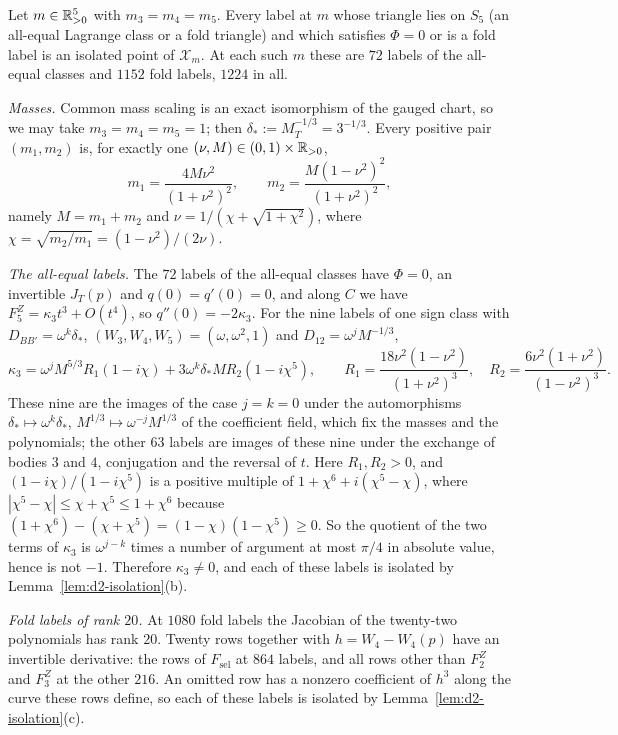 \begin{lemma}\label{lem:d2-L5}
Let $m\in\mathbb{R}_{>0}^5$ with $m_3=m_4=m_5$.  Every label at $m$ whose triangle lies on $S_5$ \textup{(}an
all-equal Lagrange class or a fold triangle\textup{)} and which satisfies $\Phi=0$ or is a fold
label is an isolated point of $\mathcal X_m$.  At each such $m$ these are $72$ labels of the all-equal
classes and $1152$ fold labels, $1224$ in all.
\end{lemma}

\emph{Masses.}  Common mass scaling is an exact isomorphism of the gauged chart, so we may take
$m_3=m_4=m_5=1$; then $\delta_*:=M_T^{-1/3}=3^{-1/3}$.  Every positive pair $(m_1,m_2)$ is, for
exactly one $(\nu,M)\in(0,1)\times\mathbb{R}_{>0}$,
\[
  m_1=\frac{4M\nu^2}{(1+\nu^2)^2},\qquad m_2=\frac{M(1-\nu^2)^2}{(1+\nu^2)^2},
\]
namely $M=m_1+m_2$ and $\nu=1/(\chi+\sqrt{1+\chi^2})$, where
$\chi=\sqrt{m_2/m_1}=(1-\nu^2)/(2\nu)$.

\emph{The all-equal labels.}  The $72$ labels of the all-equal classes have $\Phi=0$, an
invertible $J_T(p)$ and $q(0)=q'(0)=0$, and along $C$ we have $F^Z_5=\kappa_3t^3+O(t^4)$, so
$q''(0)=-2\kappa_3$.  For the nine labels of one sign class with $D_{BB'}=\omega^k\delta_*$,
$(W_3,W_4,W_5)=(\omega,\omega^2,1)$ and $D_{12}=\omega^jM^{-1/3}$,
\[
  \kappa_3=\omega^jM^{5/3}R_1(1-i\chi)+3\omega^k\delta_*MR_2(1-i\chi^5),\qquad
  R_1=\frac{18\nu^2(1-\nu^2)}{(1+\nu^2)^3},\quad R_2=\frac{6\nu^2(1+\nu^2)}{(1-\nu^2)^3}.
\]
These nine are the images of the case $j=k=0$ under the automorphisms
$\delta_*\mapsto\omega^k\delta_*$, $M^{1/3}\mapsto\omega^{-j}M^{1/3}$ of the coefficient field,
which fix the masses and the polynomials; the other $63$ labels are images of these nine under
the exchange of bodies $3$ and $4$, conjugation and the reversal of $t$.  Here $R_1,R_2>0$, and
$(1-i\chi)/(1-i\chi^5)$ is a positive multiple of $1+\chi^6+i(\chi^5-\chi)$, where
$|\chi^5-\chi|\le\chi+\chi^5\le1+\chi^6$ because $(1+\chi^6)-(\chi+\chi^5)=(1-\chi)(1-\chi^5)\ge0$.
So the quotient of the two terms of $\kappa_3$ is $\omega^{j-k}$ times a number of argument at
most $\pi/4$ in absolute value, hence is not $-1$.  Therefore $\kappa_3\ne0$, and each of these
labels is isolated by Lemma~\ref{lem:d2-isolation}(b).

\emph{Fold labels of rank $20$.}  At $1080$ fold labels the Jacobian of the twenty-two
polynomials has rank $20$.  Twenty rows together with $h=W_4-W_4(p)$ have an invertible
derivative: the rows of $F_{\mathrm{sel}}$ at $864$ labels, and all rows other than $F^Z_2$ and
$F^Z_3$ at the other $216$.  An omitted row has a nonzero coefficient of $h^3$ along the curve
these rows define, so each of these labels is isolated by Lemma~\ref{lem:d2-isolation}(c).

